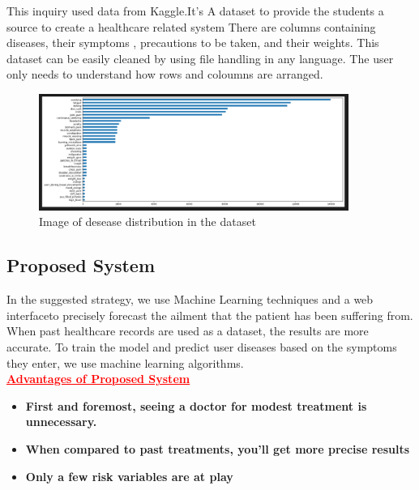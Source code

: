 This inquiry used data from Kaggle.It's A dataset to provide the students a source to create a healthcare related system
There are columns containing diseases, their symptoms , precautions to be taken, and their weights.
This dataset can be easily cleaned by using file handling in any language. The user only needs to understand how rows and coloumns are arranged.
\newpage
\begin{figure}[htp]
    \centering
    \includegraphics[width=0.9\textwidth]{images/dataset.png}
    \caption{Image of desease distribution in the dataset}
    \label{fig:example1}
\end{figure}

\subsection{ Proposed System}
\label{sec:Proposed System}
In the suggested strategy, we use Machine Learning techniques and a web interfaceto precisely forecast the ailment that the patient has been suffering from.
 When past healthcare records are used as a dataset, the results are more accurate. 
 To train the model and predict user diseases based on the symptoms they enter, 
 we use machine learning algorithms.\\
\textcolor{red}{\underline{\textbf{Advantages of Proposed System\\}}
}
 \begin{itemize}
    \item\textbf{First and foremost, seeing a doctor for modest treatment is unnecessary.} 
    \item\textbf{When compared to past treatments, you'll get more precise results} 
    \item\textbf{Only a few risk variables are at play} 

\end{itemize}

